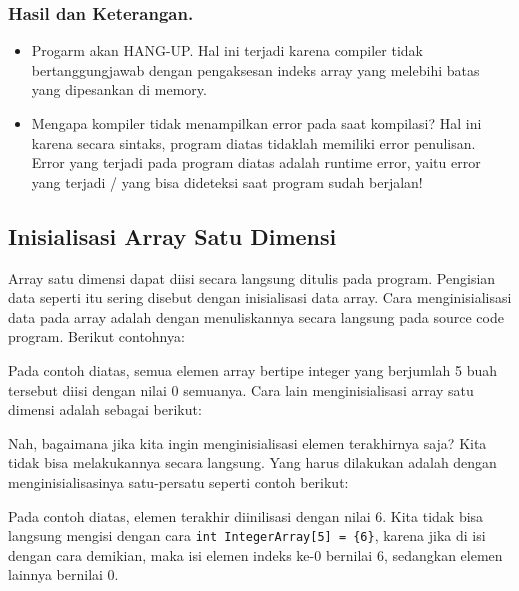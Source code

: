 \subsubsection*{Hasil dan Keterangan.}

\begin{itemize}

\item
 Progarm akan HANG-UP. Hal ini terjadi karena compiler tidak
 bertanggungjawab dengan pengaksesan indeks array yang melebihi batas
 yang dipesankan di memory.
\item
 Mengapa kompiler tidak menampilkan error pada saat kompilasi? Hal ini
 karena secara sintaks, program diatas tidaklah memiliki error
 penulisan. Error yang terjadi pada program diatas adalah runtime
 error, yaitu error yang terjadi / yang bisa dideteksi saat program
 sudah berjalan!
\end{itemize}

\subsection{Inisialisasi Array Satu Dimensi}\label{inisialisasi-array-satu-dimensi}

Array satu dimensi dapat diisi secara langsung ditulis pada program.
Pengisian data seperti itu sering disebut dengan inisialisasi data
array. Cara menginisialisasi data pada array adalah dengan menuliskannya
secara langsung pada source code program. Berikut contohnya:



Pada contoh diatas, semua elemen array bertipe integer yang berjumlah 5
buah tersebut diisi dengan nilai 0 semuanya. Cara lain menginisialisasi
array satu dimensi adalah sebagai berikut:



Nah, bagaimana jika kita ingin menginisialisasi elemen terakhirnya saja?
Kita tidak bisa melakukannya secara langsung. Yang harus dilakukan
adalah dengan menginisialisasinya satu-persatu seperti contoh berikut:



Pada contoh diatas, elemen terakhir diinilisasi dengan nilai 6. Kita
tidak bisa langsung mengisi dengan cara
\texttt{int\ IntegerArray{[}5{]}\ =\ \{6\}}, karena jika di isi dengan
cara demikian, maka isi elemen indeks ke-0 bernilai 6, sedangkan elemen
lainnya bernilai 0.

